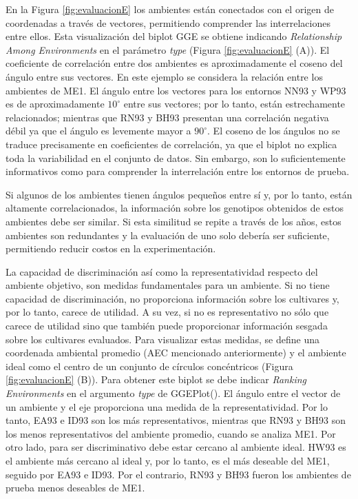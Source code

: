 En la Figura \ref{fig:evaluacionE} los ambientes están conectados con el origen de coordenadas a través de vectores, permitiendo comprender las interrelaciones entre ellos.  Esta visualización del biplot GGE se obtiene indicando \emph{Relationship Among Environments} en el parámetro \emph{type} (Figura \ref{fig:evaluacionE} (A)). El coeficiente de correlación entre dos ambientes es aproximadamente el coseno del ángulo entre sus vectores. 
En este ejemplo se considera la relación entre los ambientes de ME1. El ángulo entre los vectores para los entornos NN93 y WP93 es de aproximadamente $10^{\circ}$ entre sus vectores; por lo tanto, están estrechamente relacionados; mientras que RN93 y BH93 presentan una correlación negativa débil ya que el ángulo es levemente mayor a $90^{\circ}$. El coseno de los ángulos no se traduce precisamente en coeficientes de correlación, ya que el biplot no explica toda la variabilidad en el conjunto de datos. Sin embargo, son lo suficientemente informativos como para comprender la interrelación entre los entornos de prueba. 

Si algunos de los ambientes tienen ángulos pequeños entre sí y, por lo tanto, están altamente correlacionados, la información sobre los genotipos obtenidos de estos ambientes debe ser similar. Si esta similitud se repite a través de los años, estos ambientes son redundantes y la evaluación de uno solo debería ser suficiente, permitiendo reducir costos en la experimentación.


La capacidad de discriminación así como la representatividad respecto del ambiente objetivo, son medidas fundamentales para un ambiente. Si no tiene capacidad de discriminación, no proporciona información sobre los cultivares y, por lo tanto, carece de utilidad. A su vez, si no es representativo no sólo que carece de utilidad sino que también puede proporcionar información sesgada sobre los cultivares evaluados. Para visualizar estas medidas, se define una coordenada ambiental promedio (AEC mencionado anteriormente) y el ambiente ideal como el centro de un conjunto de círculos concéntricos (Figura \ref{fig:evaluacionE} (B)). Para obtener este biplot se debe indicar \emph{Ranking Environments} en el argumento \emph{type} de \textcolor{fandango}{GGEPlot()}. El ángulo entre el vector de un ambiente y el eje proporciona una medida de la representatividad. Por lo tanto, EA93 e ID93 son los más representativos, mientras que RN93 y BH93 son los menos representativos del ambiente promedio, cuando se analiza ME1. Por otro lado, para ser discriminativo debe estar cercano al ambiente ideal. HW93 es el ambiente más cercano al ideal y, por lo tanto, es el más deseable del ME1, seguido por EA93 e ID93. Por el contrario, RN93 y BH93 fueron los ambientes de prueba menos deseables de ME1.  \\

